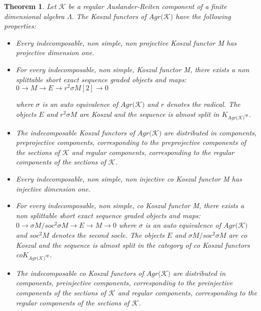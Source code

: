 \documentclass{amsart}
\newtheorem{theorem}{Theorem}
\theoremstyle{plain}
\numberwithin{equation}{section}
\begin{document}
\begin{theorem}
Let $\mathcal{K}$ be a regular Auslander-Reiten component of a finite
dimensional algebra $\Lambda .$ The Koszul functors of $Agr(\mathcal{K)}$
have the following properties:

\begin{itemize}
\item[(i)] Every indecomposable, non simple, non projective Koszul functor M
has projective dimension one.

\item[(ii)] For every indecomposable, non simple, Koszul functor M, there
exists a non splittable short exact sequence graded objects and maps: $0\rightarrow M\rightarrow E\rightarrow r^{2}\sigma M[2]\rightarrow 0$

where $\sigma $ is an auto equivalence of $Agr(\mathcal{K)}$ and $r$ denotes
the radical. The objects $E$ and $r^{2}\sigma M$ are Koszul and the sequence
is almost split in $K_{Agr(\mathcal{K)}^{op}}$.

\item[(iii)] The indecomposable Koszul functors of $Agr(\mathcal{K)}$ are
distributed in components, preprojective components, corresponding to the
preprojective components of the sections of $\mathcal{K}$ and regular
components, corresponding to the regular components of the sections of $\mathcal{K}$.

\item[(i')] Every indecomposable, non simple, non injective co Koszul
functor M has injective dimension one.

\item[(ii')] For every indecomposable, non simple, co Koszul functor M,
there exists a non splittable short exact sequence graded objects and maps: $0\rightarrow \sigma M/soc^{2}\sigma M\rightarrow E\rightarrow M\rightarrow 0$
where $\sigma $ is an auto equivalence of $Agr(\mathcal{K)}$ and $soc^{2}M$
denotes the second socle. The objects $E$ and $\sigma M/soc^{2}\sigma M$ are
co Koszul and the sequence is almost split in the category of co Koszul
functors co$K_{Agr(\mathcal{K)}^{op}}$.

\item[(iii')] The indecomposable co Koszul functors of $Agr(\mathcal{K)}$
are distributed in components, preinjective components, corresponding to the
preinjective components of the sections of $\mathcal{K}$ and regular
components, corresponding to the regular components of the sections of $\mathcal{K}$.
\end{itemize}
\end{theorem}
\end{document}
